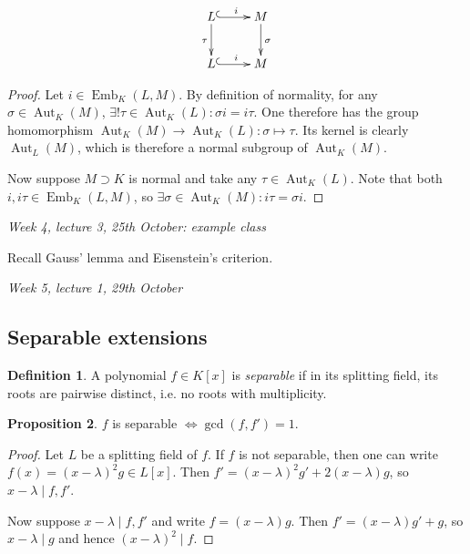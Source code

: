 \documentclass{article}
\newcommand{\Aut}{\operatorname{Aut}}
\newcommand{\Emb}{\operatorname{Emb}}
\theoremstyle{definition}
\newtheorem{defn}{Definition}[subsection]
\newtheorem{prop}[defn]{Proposition}
\begin{document}
\begin{minipage}{0.2\textwidth}
\[
\xymatrix{
L\ar@{^{(}->}[r]^i\ar[d]_\tau & M\ar[d]^\sigma \\
L\ar@{^{(}->}[r]^i & M
}
\]
\end{minipage}
\begin{minipage}{0.8\textwidth}
\begin{proof}
\setlength\parskip{0.3em}
Let $i\in\Emb_K(L,M)$. By definition of normality, for any $\sigma\in\Aut_K(M)$, $\exists !\tau\in\Aut_K(L):\sigma i=i\tau$. One therefore has the group homomorphism $\Aut_K(M)\rightarrow\Aut_K(L):\sigma\mapsto\tau$. Its kernel is clearly $\Aut_L(M)$, which is therefore a normal subgroup of $\Aut_K(M)$.

Now suppose $M\supset K$ is normal and take any $\tau\in\Aut_K(L)$. Note that both $i,i\tau\in\Emb_K(L,M)$, so $\exists\sigma\in\Aut_K(M):i\tau=\sigma i$.
\end{proof}
\end{minipage}

\begin{flushright}
\textit{Week 4, lecture 3, 25th October: example class}
\end{flushright}

Recall Gauss' lemma and Eisenstein's criterion.

\begin{flushright}
\textit{Week 5, lecture 1, 29th October}
\end{flushright}

\subsection{Separable extensions}
\begin{defn}
A polynomial $f\in K[x]$ is \textit{separable} if in its splitting field, its roots are pairwise distinct, i.e. no roots with multiplicity.
\end{defn}

\begin{prop}
\label{prop:fsepiffgcdffdis1}
$f$ is separable $\iff\gcd(f,f')=1$.
\end{prop}
\begin{proof}
Let $L$ be a splitting field of $f$. If $f$ is not separable, then one can write $f(x)=(x-\lambda)^2g\in L[x]$. Then $f'=(x-\lambda)^2g'+2(x-\lambda)g$, so $x-\lambda\mid f,f'$.

Now suppose $x-\lambda\mid f,f'$ and write $f=(x-\lambda)g$. Then $f'=(x-\lambda)g'+g$, so $x-\lambda\mid g$ and hence $(x-\lambda)^2\mid f$.
\end{proof}
\end{document}

